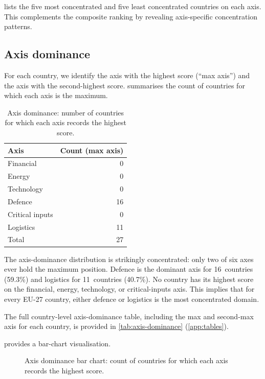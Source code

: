  lists the five most concentrated and five
least concentrated countries on each axis.  This complements the
composite ranking by revealing axis-specific concentration patterns.



\subsection{Axis dominance}\label{sec:axis-dominance}

For each country, we identify the axis with the highest score (``max
axis'') and the axis with the second-highest score.
 summarises the count of countries
for which each axis is the maximum.

\begin{table}[htbp]
\centering
\caption{Axis dominance: number of countries for which each axis
  records the highest score.}
\label{tab:axis-dominance-summary}
\begin{tabular}{@{}lr@{}}
\toprule
\textbf{Axis} & \textbf{Count (max axis)} \\
\midrule
Financial       & 0 \\
Energy          & 0 \\
Technology      & 0 \\
Defence         & 16 \\
Critical inputs & 0 \\
Logistics       & 11 \\
\midrule
Total           & 27 \\
\bottomrule
\end{tabular}
\end{table}

The axis-dominance distribution is strikingly concentrated: only two
of six axes ever hold the maximum position.  Defence is the dominant
axis for 16~countries (59.3\%) and logistics for 11~countries (40.7\%).
No country has its highest score on the financial, energy, technology,
or critical-inputs axis.  This implies that for every EU-27 country,
either defence or logistics is the most concentrated domain.

The full country-level axis-dominance table, including the max and
second-max axis for each country, is provided in \cref{tab:axis-dominance}
(\cref{app:tables}).

 provides a bar-chart visualisation.

\begin{figure}[htbp]
\centering

\caption{Axis dominance bar chart: count of countries for which each
  axis records the highest score.}
\label{fig:axis-dominance-bar}
\end{figure}

